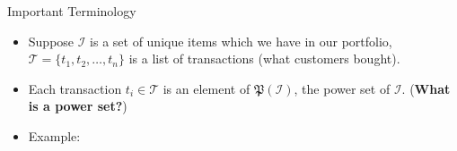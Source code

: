 \begin{frame}
\end{frame}


\begin{dwHeaderFrame}{Important Terminology}
	\begin{itemize}
		\item Suppose $\mathcal{I}$ is a set of unique items which we have in our portfolio,
			$\mathcal{T} = \{ t_1, t_2, \dots, t_n \}$ is a list of transactions (what customers bought).
		\item Each transaction $t_i \in \mathcal{T}$ is an element of $\mathfrak{P}(\mathcal{I})$, the power set of $\mathcal{I}$. (\textbf{What is a power set?})
		\item Example:
	\end{itemize}
\end{dwHeaderFrame}



